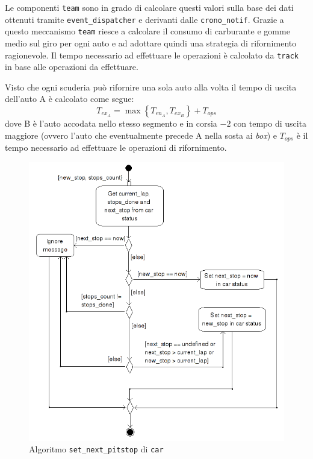 \documentclass[11pt,a4paper]{report}
\begin{document}
Le componenti \texttt{team} sono in grado di calcolare questi valori sulla base dei dati ottenuti tramite \texttt{event\_dispatcher} e derivanti dalle \texttt{crono\_notif}. Grazie a questo meccanismo \texttt{team} riesce a calcolare il consumo di carburante e gomme medio sul giro per ogni auto e ad adottare quindi una strategia di rifornimento ragionevole.
Il tempo necessario ad effettuare le operazioni è calcolato da \texttt{track} in base alle operazioni da effettuare.

Visto che ogni scuderia può rifornire una sola auto alla volta il tempo di uscita dell'auto A è calcolato come segue:
\[ T_{ex_A} = \max \left\{ T_{en_A}, T_{ex_B} \right\} + T_{ops} \]
dove B è l'auto accodata nello stesso segmento e in corsia $-2$ con tempo di uscita maggiore (ovvero l'auto che eventualmente precede A nella sosta ai \textit{box}) e $T_{ops}$ è il tempo necessario ad effettuare le operazioni di rifornimento.

\begin{figure}
\includegraphics[width=\textwidth]{diagrammi/NextPitstop}
\caption{Algoritmo \texttt{set\_next\_pitstop} di \texttt{car}}
\label{fig:nextPitstop}
\end{figure}
\end{document}
